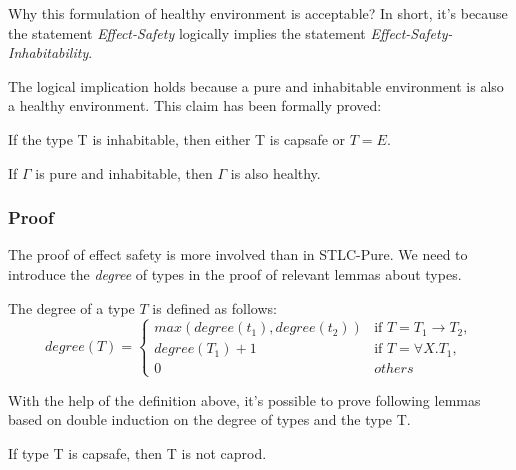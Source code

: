 Why this formulation of healthy environment is acceptable? In short,
it's because the statement \emph{Effect-Safety} logically implies the
statement \emph{Effect-Safety-Inhabitability}.

The logical implication holds because a pure and inhabitable
environment is also a healthy environment. This claim has been
formally proved:

\begin{theorem}
  If the type T is inhabitable, then either T is capsafe or $T = E$.
\end{theorem}

\begin{theorem}
  If $\Gamma$ is pure and inhabitable, then $\Gamma$ is also healthy.
\end{theorem}


\subsubsection{Proof}

The proof of effect safety is more involved than in STLC-Pure. We need
to introduce the \emph{degree} of types in the proof of
relevant lemmas about types.

\begin{definition}
  The degree of a type $T$ is defined as follows:
  \begin{equation*}
    degree(T) =
    \begin{cases}
      max(degree(t_1), degree(t_2)) & \text{if } T = T_1 \to T_2,\\
      degree(T_1) + 1 & \text{if } T = \forall X.T_1,\\
      0 & others
    \end{cases}
  \end{equation*}
\end{definition}

With the help of the definition above, it's possible to prove
following lemmas based on double induction on the degree of types and
the type T.

\begin{lemma}
 If type T is capsafe, then T is not caprod.
\end{lemma}

